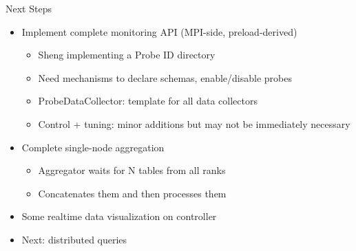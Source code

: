 \documentclass[]{beamer}
\begin{document}
%
%
%
%

\begin{frame}{Next Steps}
	\begin{itemize}
		\item Implement complete monitoring API (MPI-side, preload-derived)
      \begin{itemize}
        \item Sheng implementing a Probe ID directory
        \item Need mechanisms to declare schemas, enable/disable probes
        \item ProbeDataCollector: template for all data collectors
        \item Control + tuning: minor additions but may not be immediately necessary
      \end{itemize}
    \item Complete single-node aggregation
      \begin{itemize}
        \item Aggregator waits for N tables from all ranks
        \item Concatenates them and then processes them
      \end{itemize}
    \item Some realtime data visualization on controller
    \item Next: distributed queries

	\end{itemize}
\end{frame}
\end{document}

